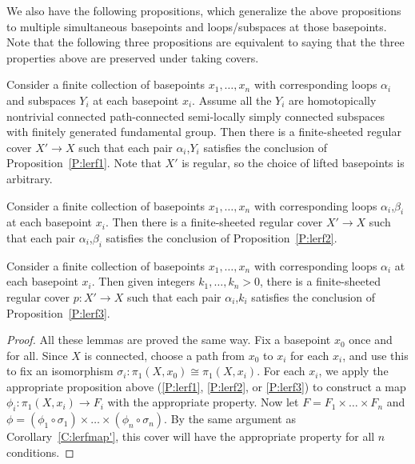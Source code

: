 We also have the following propositions, which generalize the above
propositions to multiple simultaneous basepoints and loops/subspaces at those
basepoints. Note that the following three propositions are equivalent to saying
that the three properties above are preserved under taking covers.

\begin{prop}\label{P:lerf1'}

Consider a finite collection of basepoints $x_1,\dots,x_n$ with corresponding
loops $\alpha_i$ and subspaces $Y_i$ at each basepoint $x_i$. Assume all the
$Y_i$ are homotopically nontrivial connected path-connected semi-locally simply
connected subspaces with finitely generated fundamental group. Then there is
a finite-sheeted regular cover $X' \to X$ such that each pair $\alpha_i$,$Y_i$
satisfies the conclusion of Proposition~\ref{P:lerf1}.  Note that $X'$ is
regular, so the choice of lifted basepoints is arbitrary.

\end{prop}

\begin{prop}\label{P:lerf2'}

Consider a finite collection of basepoints $x_1,\dots,x_n$ with corresponding
loops $\alpha_i$,$\beta_i$ at each basepoint $x_i$. Then there is
a finite-sheeted regular cover $X' \to X$ such that each pair
$\alpha_i$,$\beta_i$ satisfies the conclusion of Proposition~\ref{P:lerf2}.

\end{prop}

\begin{prop}\label{P:lerf3'}

Consider a finite collection of basepoints $x_1,\dots,x_n$ with corresponding
loops $\alpha_i$ at each basepoint $x_i$. Then given integers
$k_1,\dots,k_n>0$, there is a finite-sheeted regular cover $p \colon X' \to X$
such that each pair $\alpha_i$,$k_i$ satisfies the conclusion of
Proposition~\ref{P:lerf3}.

\end{prop}

\begin{proof}

All these lemmas are proved the same way. Fix a basepoint $x_0$ once and for
all.  Since $X$ is connected, choose a path from $x_0$ to $x_i$ for each $x_i$,
and use this to fix an isomorphism $\sigma_i \colon \pi_1(X,x_0) \cong
\pi_1(X,x_i)$.  For each $x_i$, we apply the appropriate proposition above
(\ref{P:lerf1}, \ref{P:lerf2}, or \ref{P:lerf3}) to construct a map $\phi_i
\colon \pi_1(X,x_i) \to F_i$ with the appropriate property. Now let $F = F_1
\times \dots \times F_n$ and $\phi = (\phi_1 \circ \sigma_1) \times \dots
\times (\phi_n \circ \sigma_n)$.  By the same argument as
Corollary~\ref{C:lerfmap'}, this cover will have the appropriate property for
all $n$ conditions.

\end{proof}
